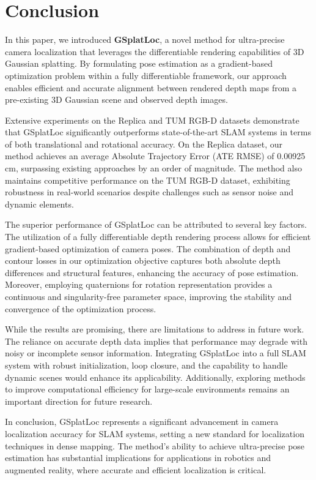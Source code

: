 \documentclass[twocolumn]{article} %
\begin{document}
\section{Conclusion}\label{conclusion}

In this paper, we introduced \textbf{GSplatLoc}, a novel method for
ultra-precise camera localization that leverages the differentiable
rendering capabilities of 3D Gaussian splatting. By formulating pose
estimation as a gradient-based optimization problem within a fully
differentiable framework, our approach enables efficient and accurate
alignment between rendered depth maps from a pre-existing 3D Gaussian
scene and observed depth images.

Extensive experiments on the Replica and TUM RGB-D datasets demonstrate
that GSplatLoc significantly outperforms state-of-the-art SLAM systems
in terms of both translational and rotational accuracy. On the Replica
dataset, our method achieves an average Absolute Trajectory Error (ATE
RMSE) of 0.00925\,cm, surpassing existing approaches by an order of
magnitude. The method also maintains competitive performance on the TUM
RGB-D dataset, exhibiting robustness in real-world scenarios despite
challenges such as sensor noise and dynamic elements.

The superior performance of GSplatLoc can be attributed to several key
factors. The utilization of a fully differentiable depth rendering
process allows for efficient gradient-based optimization of camera
poses. The combination of depth and contour losses in our optimization
objective captures both absolute depth differences and structural
features, enhancing the accuracy of pose estimation. Moreover, employing
quaternions for rotation representation provides a continuous and
singularity-free parameter space, improving the stability and
convergence of the optimization process.

While the results are promising, there are limitations to address in
future work. The reliance on accurate depth data implies that
performance may degrade with noisy or incomplete sensor information.
Integrating GSplatLoc into a full SLAM system with robust
initialization, loop closure, and the capability to handle dynamic
scenes would enhance its applicability. Additionally, exploring methods
to improve computational efficiency for large-scale environments remains
an important direction for future research.

In conclusion, GSplatLoc represents a significant advancement in camera
localization accuracy for SLAM systems, setting a new standard for
localization techniques in dense mapping. The method's ability to
achieve ultra-precise pose estimation has substantial implications for
applications in robotics and augmented reality, where accurate and
efficient localization is critical.
\end{document}
